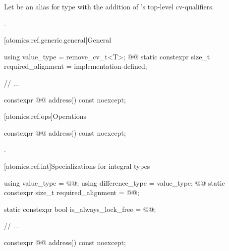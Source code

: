 \documentclass{wg21}
\begin{document}

\begin{addedblock}
Let  be an alias for type 
with the addition of 's top-level cv-qualifiers.
\end{addedblock}

.

[atomics.ref.generic.general]{General}



\begin{codeblock}
using value_type = remove_cv_t<T>;
@@
static constexpr size_t required_alignment = implementation-defined;

// ...

constexpr @@ address() const noexcept;
\end{codeblock}

[atomics.ref.ops]{Operations}


%
\begin{itemdecl}

constexpr @@ address() const noexcept;
\end{itemdecl}

\begin{itemdescr}
\pnum
\returns
{}.
\end{itemdescr}

[atomics.ref.int]{Specializations for integral types}
\begin{codeblock}
using value_type = @@;
using difference_type = value_type;
@@
static constexpr size_t required_alignment = @@;

static constexpr bool is_always_lock_free = @@;

// ...

constexpr @@ address() const noexcept;
\end{codeblock}
\end{document}
